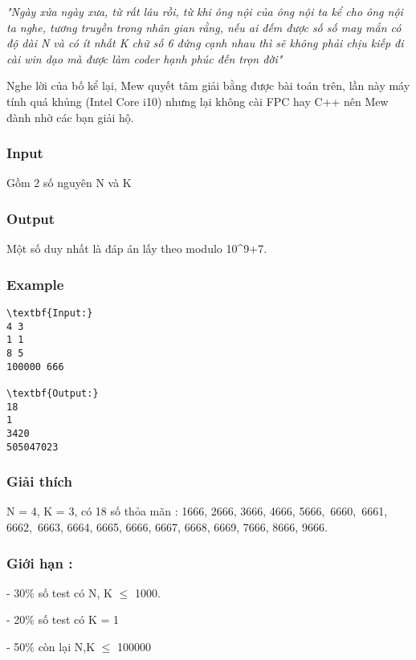 

\emph{"Ngày xửa ngày xưa, từ rất lâu rồi, từ khi ông nội của ông nội ta kể cho ông nội ta nghe, tương truyền trong nhân gian rằng, nếu ai đếm được số số may mắn có độ dài N và có ít nhất K chữ số 6 đứng cạnh nhau thì sẽ không phải chịu kiếp đi cài win dạo mà được làm coder hạnh phúc đến trọn đời" }

Nghe lời của bố kể lại, Mew quyết tâm giải bằng được bài toán trên, lần này máy tính quá khủng (Intel Core i10) nhưng lại không cài FPC hay C++ nên Mew đành nhờ các bạn giải hộ.

\subsubsection{Input}

Gồm 2 số nguyên N và K

\subsubsection{Output}

Một số duy nhất là đáp án lấy theo modulo 10^9+7.

\subsubsection{Example}
\begin{verbatim}
\textbf{Input:}
4 3
1 1
8 5
100000 666

\textbf{Output:}
18
1
3420
505047023
\end{verbatim}

\subsubsection{Giải thích}

N = 4, K = 3, có 18 số thỏa mãn : 1666, 2666, 3666, 4666, 5666, 6660, 6661, 6662, 6663, 6664, 6665, 6666, 6667, 6668, 6669, 7666, 8666, 9666.

\subsubsection{Giới hạn :}

- 30\% số test có N, K  $\le$  1000.

- 20\% số test có K = 1

- 50\% còn lại N,K  $\le$  100000 
